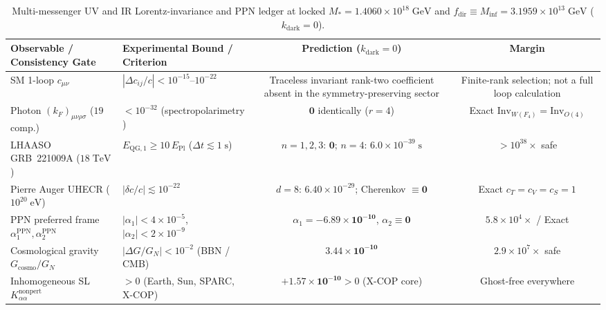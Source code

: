 \documentclass[11pt,a4paper]{article}
\begin{document}
\begin{table}[!htbp]
\centering
\caption{Multi-messenger UV and IR Lorentz-invariance and PPN ledger at locked $M_* = 1.4060\times 10^{18}\;\mathrm{GeV}$ and $f_{\mathrm{dir}} \equiv M_{\mathrm{inf}} = 3.1959\times 10^{13}\;\mathrm{GeV}$ ($k_{\mathrm{dark}} = 0$).}
\label{tab:liv-ppn-ledger}
\vspace{0.35em}
\footnotesize
\setlength{\tabcolsep}{4pt}
\renewcommand{\arraystretch}{1.16}
\begin{tabularx}{\textwidth}{>{\raggedright\arraybackslash}X >{\raggedright\arraybackslash}X c c}
\toprule
\textbf{Observable / Consistency Gate} & \textbf{Experimental Bound / Criterion} & \textbf{Prediction ($k_{\mathrm{dark}}=0$)} & \textbf{Margin} \\
\midrule
SM 1-loop $c_{\mu\nu}$ & $|\Delta c_{ij}/c| < 10^{-15}\text{--}10^{-22}$ \cite{KosteleckyMewes2002,Liberati2013} & Traceless invariant rank-two coefficient absent in the symmetry-preserving sector & Finite-rank selection; not a full loop calculation \\
Photon $(k_F)_{\mu\nu\rho\sigma}$ ($19$ comp.) & $< 10^{-32}$ (spectropolarimetry \cite{KosteleckyMewes2002}) & $\mathbf{0}$ identically ($r=4$) & Exact $\mathrm{Inv}_{W(F_4)}=\mathrm{Inv}_{O(4)}$ \\
LHAASO GRB~221009A ($18\;\mathrm{TeV}$) & $E_{\mathrm{QG},1} \ge 10\,E_{\mathrm{Pl}}$ ($\Delta t \lesssim 1\;\mathrm{s}$) \cite{LHAASO2024LIV} & $n=1,2,3:\,\mathbf{0}$;\; $n=4:\,6.0\times 10^{-39}\;\mathrm{s}$ & $> 10^{38}\times$ safe \\
Pierre Auger UHECR ($10^{20}\;\mathrm{eV}$) & $|\delta c/c| \lesssim 10^{-22}$ \cite{ElliottMooreStoica2005} & $d=8:\,6.40\times 10^{-29}$;\; Cherenkov $\equiv \mathbf{0}$ & Exact $c_T=c_V=c_S=1$ \\
PPN preferred frame $\alpha_1^{\mathrm{PPN}}, \alpha_2^{\mathrm{PPN}}$ & $|\alpha_1| < 4\times 10^{-5}$, $|\alpha_2| < 2\times 10^{-9}$ \cite{Will2014} & $\alpha_1 = \mathbf{-6.89\times 10^{-10}}$,\; $\alpha_2 \equiv \mathbf{0}$ & $5.8\times 10^4\times$ / Exact \\
Cosmological gravity $G_{\mathrm{cosmo}}/G_N$ & $|\Delta G/G_N| < 10^{-2}$ (BBN / CMB) & $\mathbf{3.44\times 10^{-10}}$ & $2.9\times 10^7\times$ safe \\
Inhomogeneous SL $K_{\alpha\alpha}^{\mathrm{nonpert}}$ & $> 0$ (Earth, Sun, SPARC, X-COP) & $\mathbf{+1.57\times 10^{-10}} > 0$ (X-COP core) & Ghost-free everywhere \\
\bottomrule
\end{tabularx}
\end{table}
\end{document}
